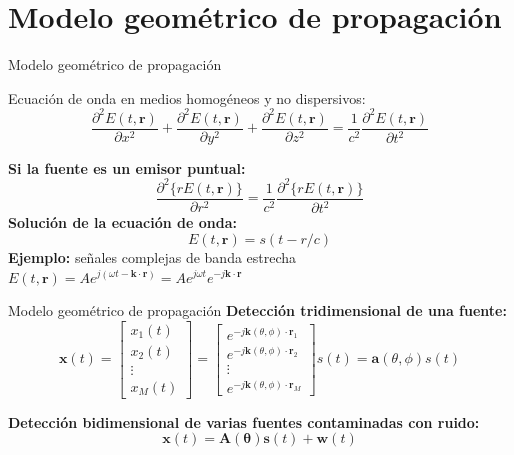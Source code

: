 \documentclass[12pt,aspectratio=169]{beamer}
\begin{document}
	\section{Modelo geométrico de propagación}
	
	\begin{frame}{Modelo geométrico de propagación}
		\begin{block}{Ecuación de onda en medios homogéneos y no dispersivos:}
		\begin{equation}
		\frac{\partial^2 E(t, \mathbf{r})}{\partial x^2} + \frac{\partial^2 E(t, \mathbf{r})}{\partial y^2} + \frac{\partial^2 E(t, \mathbf{r})}{\partial z^2} = \frac{1}{c^2}\frac{\partial^2 E(t, \mathbf{r})}{\partial t^2}
		\label{EcOnda}
		\end{equation}
		\end{block}
		\textbf{Si la fuente es un emisor puntual:}
		\begin{equation}
		\frac{\partial^2 \{r E(t, \mathbf{r})\}}{\partial r^2} = \frac{1}{c^2}\frac{\partial^2 \{r E(t, \mathbf{r})\}}{\partial t^2}
		\label{EcOnda1}	
		\end{equation}
		\textbf{Solución de la ecuación de onda:}		
		\begin{equation}
		E(t, \mathbf{r}) = s(t-r/c)
		\label{EcOndaSol1}
		\end{equation}
		\textbf{Ejemplo:} señales complejas de banda estrecha
		$E(t, \mathbf{r}) = A e^{j(\omega t - \mathbf{k}\cdot\mathbf{r})} = A e^{j\omega t} e^{-j\mathbf{k}\cdot\mathbf{r}}$
	\end{frame}	
	
	\begin{frame}{Modelo geométrico de propagación}
		\textbf{Detección tridimensional de una fuente:}
		\begin{equation}
		\mathbf{x}(t) = 
		\begin{bmatrix}
		x_1(t) \\
		x_2(t) \\
		\vdots \\
		x_M(t)
		\end{bmatrix}
		=
		\begin{bmatrix}
		e^{-j\mathbf{k}(\theta, \phi)\cdot \mathbf{r}_1} \\
		e^{-j\mathbf{k}(\theta, \phi)\cdot \mathbf{r}_2} \\
		\vdots \\
		e^{-j\mathbf{k}(\theta, \phi)\cdot \mathbf{r}_M}
		\end{bmatrix} 
		s(t) = \mathbf{a}(\theta, \phi) s(t)
		\label{EcArray}
		\end{equation}
		
		\vspace{10mm}
		\textbf{Detección bidimensional de varias fuentes contaminadas con ruido:}
		\begin{equation}
		\mathbf{x}(t) = 
		\mathbf{A}(\pmb{\theta}) \mathbf{s}(t) + \mathbf{w}(t)
		\label{EcArray1}
		\end{equation}
	\end{frame}
	
\end{document}
